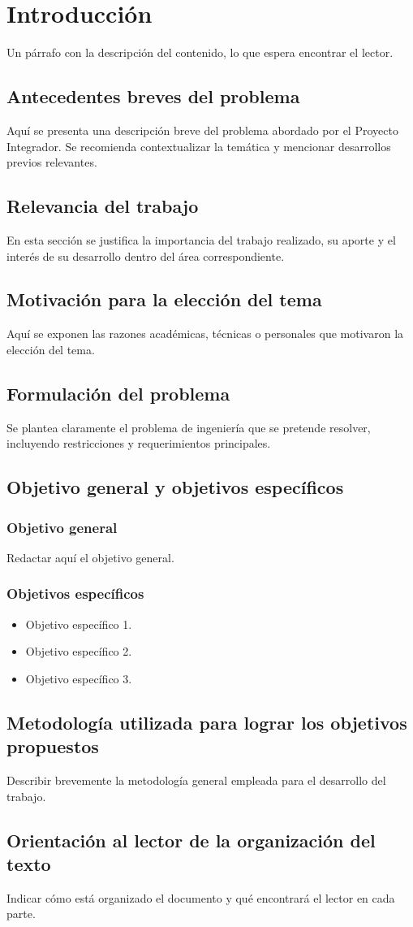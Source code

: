 \chapter{Introducción}

Un párrafo con la descripción del contenido, lo que espera encontrar el lector.

\section{Antecedentes breves del problema}
Aquí se presenta una descripción breve del problema abordado por el Proyecto Integrador. Se recomienda contextualizar la temática y mencionar desarrollos previos relevantes.

\section{Relevancia del trabajo}
En esta sección se justifica la importancia del trabajo realizado, su aporte y el interés de su desarrollo dentro del área correspondiente.

\section{Motivación para la elección del tema}
Aquí se exponen las razones académicas, técnicas o personales que motivaron la elección del tema.

\section{Formulación del problema}
Se plantea claramente el problema de ingeniería que se pretende resolver, incluyendo restricciones y requerimientos principales.

\section{Objetivo general y objetivos específicos}
\subsection{Objetivo general}
Redactar aquí el objetivo general.

\subsection{Objetivos específicos}
\begin{itemize}
    \item Objetivo específico 1.
    \item Objetivo específico 2.
    \item Objetivo específico 3.
\end{itemize}

\section{Metodología utilizada para lograr los objetivos propuestos}
Describir brevemente la metodología general empleada para el desarrollo del trabajo.

\section{Orientación al lector de la organización del texto}
Indicar cómo está organizado el documento y qué encontrará el lector en cada parte.
